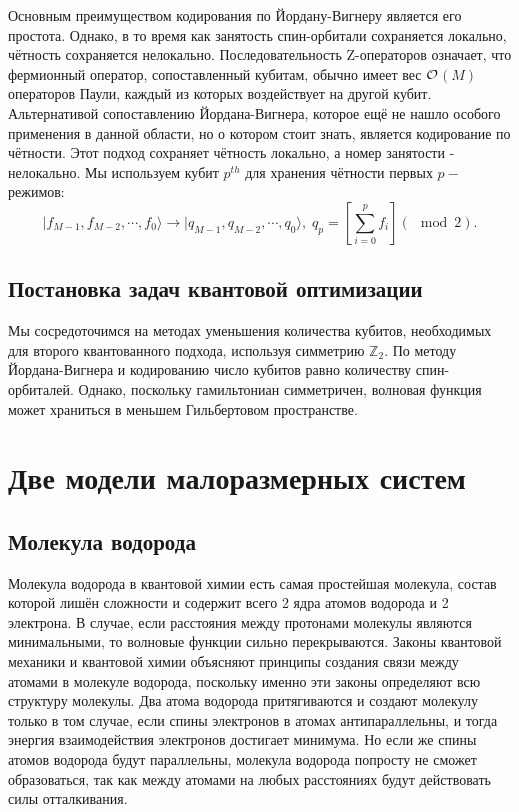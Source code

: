 \documentclass[a4paper]{report}
\begin{document}
Основным преимуществом кодирования по Йордану-Вигнеру является его простота. Однако, в то время как занятость спин-орбитали сохраняется локально, чётность сохраняется нелокально. Последовательность Z-операторов означает, что фермионный оператор, сопоставленный кубитам, обычно имеет вес ${\cal{O}}$${(M)}$ операторов Паули, каждый из которых воздействует на другой кубит. Альтернативой сопоставлению Йордана-Вигнера, которое ещё не нашло особого применения в данной области, но о котором стоит знать, является кодирование по чётности. Этот подход сохраняет чётность локально, а номер занятости - нелокально. Мы используем кубит ${p^{th}}$ для хранения чётности первых ${p-}$режимов:
    \begin{equation}\label{}
    |f_{M-1}, f_{M-2}, \cdots, f_0\rangle\rightarrow|q_{M-1}, q_{M-2}, \cdots, q_0\rangle,\; q_p=\left[ \sum_{i=0}^pf_i \right] (\!\!\!\!\!\!\mod2).
    \nonumber
    \end{equation}


\section{Постановка задач квантовой оптимизации}

Мы сосредоточимся на методах уменьшения количества кубитов, необходимых для второго квантованного подхода, используя симметрию ${\mathbb{Z}_2}$. По методу Йордана-Вигнера и кодированию  число кубитов равно количеству спин-орбиталей. Однако, поскольку гамильтониан симметричен, волновая функция может храниться в меньшем Гильбертовом пространстве.


\chapter{Две модели малоразмерных систем}


\section{Молекула водорода}

Молекула водорода в квантовой химии есть самая простейшая молекула, состав которой лишён сложности и содержит всего 2 ядра атомов водорода и 2 электрона. В случае, если расстояния между протонами молекулы являются минимальными, то волновые функции сильно перекрываются. Законы квантовой механики и квантовой химии объясняют принципы создания связи между атомами в молекуле водорода, поскольку именно эти законы определяют всю структуру молекулы. Два атома водорода притягиваются и создают молекулу только в том случае, если спины электронов в атомах антипараллельны, и тогда энергия взаимодействия электронов достигает минимума. Но если же спины атомов водорода будут параллельны, молекула водорода попросту не сможет образоваться, так как между атомами на любых расстояниях будут действовать силы отталкивания.
\end{document}
